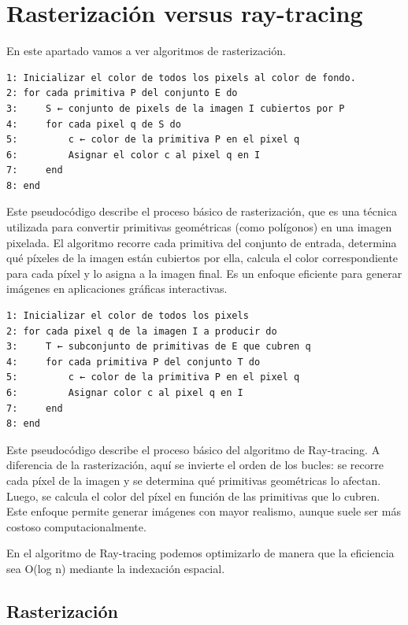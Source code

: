 \documentclass[12pt]{report} %
\begin{document}
\hypertarget{rasterizaciuxf3n-versus-ray-tracing}{%
\section{Rasterización versus
ray-tracing}\label{rasterizaciuxf3n-versus-ray-tracing}}

En este apartado vamos a ver algoritmos de rasterización.

\begin{lstlisting}
1: Inicializar el color de todos los pixels al color de fondo.
2: for cada primitiva P del conjunto E do
3:     S ← conjunto de pixels de la imagen I cubiertos por P
4:     for cada pixel q de S do
5:         c ← color de la primitiva P en el pixel q
6:         Asignar el color c al pixel q en I
7:     end
8: end
\end{lstlisting}

Este pseudocódigo describe el proceso básico de rasterización, que es
una técnica utilizada para convertir primitivas geométricas (como
polígonos) en una imagen pixelada. El algoritmo recorre cada primitiva
del conjunto de entrada, determina qué píxeles de la imagen están
cubiertos por ella, calcula el color correspondiente para cada píxel y
lo asigna a la imagen final. Es un enfoque eficiente para generar
imágenes en aplicaciones gráficas interactivas.

\begin{lstlisting}
1: Inicializar el color de todos los pixels
2: for cada pixel q de la imagen I a producir do
3:     T ← subconjunto de primitivas de E que cubren q
4:     for cada primitiva P del conjunto T do
5:         c ← color de la primitiva P en el pixel q
6:         Asignar color c al pixel q en I
7:     end
8: end
\end{lstlisting}

Este pseudocódigo describe el proceso básico del algoritmo de
Ray-tracing. A diferencia de la rasterización, aquí se invierte el orden
de los bucles: se recorre cada píxel de la imagen y se determina qué
primitivas geométricas lo afectan. Luego, se calcula el color del píxel
en función de las primitivas que lo cubren. Este enfoque permite generar
imágenes con mayor realismo, aunque suele ser más costoso
computacionalmente.

En el algoritmo de Ray-tracing podemos optimizarlo de manera que la
eficiencia sea O(log n) mediante la indexación espacial.

\hypertarget{rasterizaciuxf3n}{%
\subsection{Rasterización}\label{rasterizaciuxf3n}}
\end{document}
